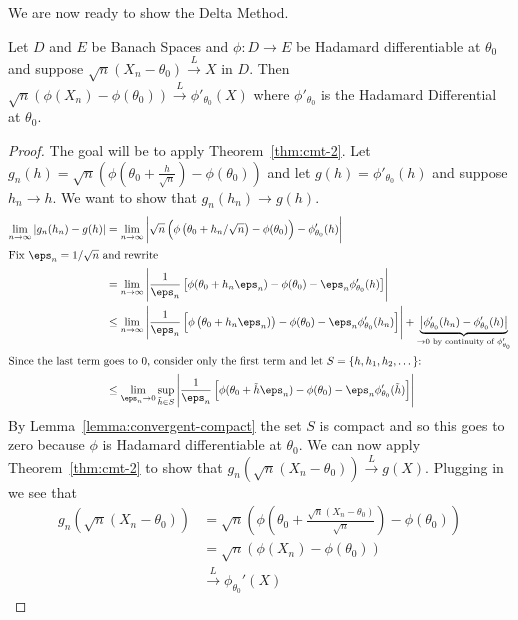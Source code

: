 We are now ready to show the Delta Method. 
\begin{theorem}
	\label{thm:delta-method}
	Let \(D\) and  \(E\) be Banach Spaces and \(\phi: D\to E\) be Hadamard differentiable at  \(\theta_0\) and suppose  \( \sqrt{n}(X_n-\theta_0)\overset{L}{\to} X\) in \(D\). Then \(\sqrt{n}\left(\phi(X_n)-\phi(\theta_0)\right)\overset{L}{\to}\phi'_{\theta_0}(X)\) where \(\phi'_{\theta_0}\) is the Hadamard Differential at \(\theta_0\).
\end{theorem}
\begin{proof}
	The goal will be to apply Theorem~\ref{thm:cmt-2}.
	Let \(g_n(h) = \sqrt{n}\left(\phi(\theta_0+\frac{h}{\sqrt{n}})-\phi(\theta_0)\right)\) and let \(g(h) = \phi'_{\theta_0}(h)\) and suppose  \(h_n\to h\). We want to show that \(g_n(h_n) \to g(h)\).
	\begin{align*}
		\lim_{n\to \infty} |g_n(h_n) - g(h)| 
		&= \lim_{n\to \infty} \left|\sqrt{n}\left(\phi\left(\theta_0+h_n/\sqrt{n}\right) - \phi(\theta_0)\right) - \phi_{\theta_0}'(h) \right| \\
		\intertext{Fix \(\eps_n=1/\sqrt{n}\) and rewrite}
		&= \lim_{n\to\infty} \left|\frac{1}{\eps_n}\left[\phi(\theta_0+h_n\eps_n)-\phi(\theta_0)- \eps_n \phi_{\theta_0}'(h)\right]\right|\\ 
		&\leq  \lim_{n\to\infty} \left|\frac{1}{\eps_n}\left[\phi\left(\theta_0 + h_n\eps_n)\right) - \phi(\theta_0)-\eps_n\phi_{\theta_0}'(h_n)\right]\right| + \underbrace{\left|\phi'_{\theta_0}(h_n) - \phi'_{\theta_0}(h)\right|}_{\to 0\text{ by continuity of }\phi'_{\theta_0}} \\
		\intertext{Since the last term goes to 0, consider only the first term and let \(S = \{h,h_1,h_2,\dots\}\):}
		&\leq \lim_{\eps_n\to 0} \sup_{\tilde h\in S} \left|\frac{1}{\eps_n}\left[\phi(\theta_0+\tilde h\eps_n)-\phi(\theta_0)- \eps_n\phi_{\theta_0}'(\tilde h)\right]\right|
	\end{align*}
	By Lemma~\ref{lemma:convergent-compact} the set \(S\) is compact and so this goes to zero because \(\phi\) is Hadamard differentiable at \(\theta_0\). We can now apply Theorem~\ref{thm:cmt-2} to show that \(g_n\left(\sqrt{n}(X_n-\theta_0)\right)\overset{L}{\to} g(X)\). Plugging in we see that
	\begin{align*}
		g_n\left(\sqrt{n}(X_n-\theta_0)\right) 
		&= \sqrt{n}\left(\phi\left(\theta_0+\frac{\sqrt{n}(X_n-\theta_0)}{\sqrt{n}} \right)-\phi(\theta_0)\right)\\
		&= \sqrt{n}\left(\phi(X_n)-\phi(\theta_0)\right) \\
		&\overset{L}{\to}\phi_{\theta_0}'(X)
	\end{align*}
\end{proof}
